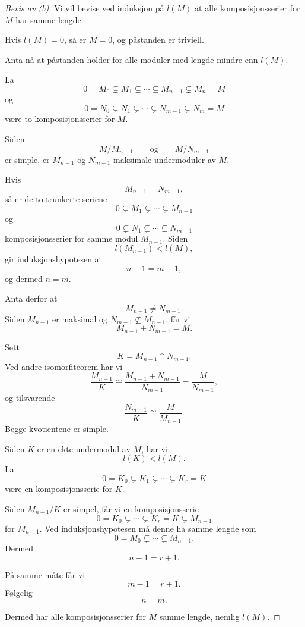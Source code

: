 \begin{proof}[Bevis av (b)]
    Vi vil bevise ved induksjon på $l(M)$ at alle 
    komposisjonsserier for $M$ har samme lengde.

    Hvis $l(M)=0$, så er $M=0$, og påstanden er triviell.

    Anta nå at påstanden holder for alle moduler med lengde 
    mindre enn $l(M)$.

    La
    \[
        0=M_0\subsetneq M_1\subsetneq\cdots
        \subsetneq M_{n-1}\subsetneq M_n=M
    \]
    og
    \[
        0=N_0\subsetneq N_1\subsetneq\cdots
        \subsetneq N_{m-1}\subsetneq N_m=M
    \]
    være to komposisjonsserier for $M$.

    Siden
    \[
        M/M_{n-1}
        \qquad\text{og}\qquad
        M/N_{m-1}
    \]
    er simple, er $M_{n-1}$ og $N_{m-1}$ maksimale
    undermoduler av $M$.

    Hvis
    \[
        M_{n-1}=N_{m-1},
    \]
    så er de to trunkerte seriene
    \[
        0\subsetneq M_1\subsetneq\cdots\subsetneq M_{n-1}
    \]
    og
    \[
        0\subsetneq N_1\subsetneq\cdots\subsetneq N_{m-1}
    \]
    komposisjonsserier for samme modul $M_{n-1}$.
    Siden
    \[
        l(M_{n-1})<l(M),
    \]
    gir induksjonshypotesen at
    \[
        n-1=m-1,
    \]
    og dermed $n=m$.

    Anta derfor at
    \[
        M_{n-1}\neq N_{m-1}.
    \]
    Siden $M_{n-1}$ er maksimal og
    $N_{m-1}\not\subseteq M_{n-1}$, får vi
    \[
        M_{n-1}+N_{m-1}=M.
    \]

    Sett
    \[
        K=M_{n-1}\cap N_{m-1}.
    \]
    Ved andre isomorfiteorem har vi
    \[
        \frac{M_{n-1}}{K}
        \cong
        \frac{M_{n-1}+N_{m-1}}{N_{m-1}}
        =
        \frac{M}{N_{m-1}},
    \]
    og tilsvarende
    \[
        \frac{N_{m-1}}{K}
        \cong
        \frac{M}{M_{n-1}}.
    \]
    Begge kvotientene er simple.

    Siden $K$ er en ekte undermodul av $M$, har vi
    \[
        l(K)<l(M).
    \]
    La
    \[
        0=K_0\subsetneq K_1\subsetneq\cdots
        \subsetneq K_r=K
    \]
    være en komposisjonsserie for $K$.

    Siden $M_{n-1}/K$ er simpel, får vi en
    komposisjonsserie
    \[
        0=K_0\subsetneq\cdots\subsetneq K_r=K
        \subsetneq M_{n-1}
    \]
    for $M_{n-1}$.
    Ved induksjonshypotesen må denne ha samme lengde som
    \[
        0=M_0\subsetneq\cdots\subsetneq M_{n-1}.
    \]
    Dermed
    \[
        n-1=r+1.
    \]

    På samme måte får vi
    \[
        m-1=r+1.
    \]
    Følgelig
    \[
        n=m.
    \]

    Dermed har alle komposisjonsserier for $M$ samme lengde,
    nemlig $l(M)$.
\end{proof}

